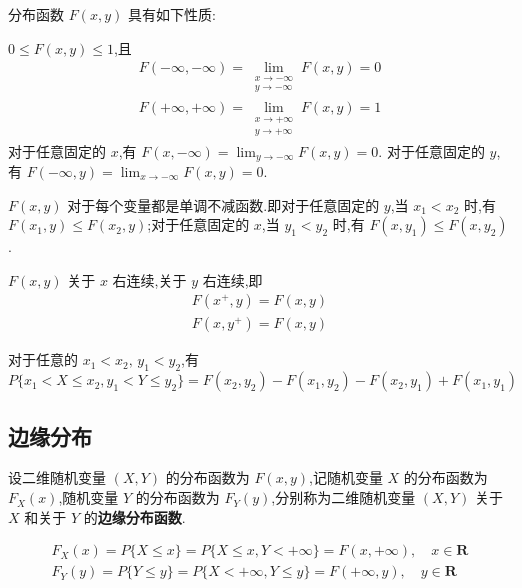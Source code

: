 分布函数 $F(x,y)$ 具有如下性质:

\begin{property}
    $0 \leqslant F(x,y) \leqslant 1$,且
    \begin{gather*}
        F(-\infty, -\infty) = \lim_{\substack{x \to -\infty \\ y \to -\infty}} F(x,y) = 0 \\
        F(+\infty, +\infty) = \lim_{\substack{x \to +\infty \\ y \to +\infty}} F(x,y) = 1
    \end{gather*}
    对于任意固定的 $x$,有 $F(x,-\infty) = \displaystyle\lim_{y \to -\infty} F(x,y) = 0$.\newline
    对于任意固定的 $y$,有 $F(-\infty,y) = \displaystyle\lim_{x \to -\infty} F(x,y) = 0$.
\end{property}

\begin{property}
    $F(x,y)$ 对于每个变量都是单调不减函数.即对于任意固定的 $y$,当 $x_1 < x_2$ 时,有 $F(x_1, y) \leqslant F(x_2, y)$;对于任意固定的 $x$,当 $y_1 < y_2$ 时,有 $F(x, y_1) \leqslant F(x, y_2)$.
\end{property}

\begin{property}
    $F(x,y)$ 关于 $x$ 右连续,关于 $y$ 右连续,即
    \begin{gather*}
        F(x^+, y) = F(x, y) \\
        F(x, y^+) = F(x, y)
    \end{gather*}
\end{property}

\begin{property}
    对于任意的 $x_1 < x_2, \, y_1 < y_2$,有
    $$
    P\{x_1 < X \leqslant x_2, y_1 < Y \leqslant y_2\} = F(x_2, y_2) - F(x_1, y_2) - F(x_2, y_1) + F(x_1, y_1)
    $$
\end{property}

\subsection{边缘分布}

\begin{definition}
    设二维随机变量 $(X,Y)$ 的分布函数为 $F(x,y)$,记随机变量 $X$ 的分布函数为 $F_{X}(x)$,随机变量 $Y$ 的分布函数为 $F_{Y}(y)$,分别称为二维随机变量 $(X,Y)$ 关于 $X$ 和关于 $Y$ 的\textbf{边缘分布函数}.
\end{definition}

\begin{gather*}
    F_{X}(x) = P\{X \leqslant x\} = P\{X \leqslant x, Y < +\infty\} = F(x, +\infty), \quad x \in \mathbf{R} \\
    F_{Y}(y) = P\{Y \leqslant y\} = P\{X < +\infty, Y \leqslant y\} = F(+\infty, y), \quad y \in \mathbf{R}
\end{gather*}

